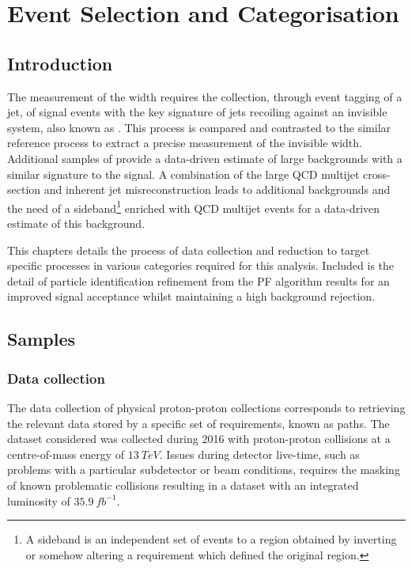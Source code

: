 \chapter{Event Selection and Categorisation}
\label{chap:analysis}


\section{Introduction}

The measurement of the \IZinv width requires the collection, through event
tagging of a jet, of \IZvvj signal events with the key signature of jets
recoiling against an invisible system, also known as \metplusjets. This
process is compared and contrasted to the similar \IDYllj reference process to
extract a precise measurement of the invisible width. Additional samples of
\IWlvj provide a data-driven estimate of large backgrounds with a similar
signature to the signal. A combination of the large QCD multijet cross-section
and inherent jet misreconstruction leads to additional backgrounds and the
need of a sideband\footnote{A sideband is an independent set of events to a
region obtained by inverting or somehow altering a requirement which defined
the original region.} enriched with QCD multijet events for a data-driven
estimate of this background.

This chapters details the process of data collection and reduction to target
specific processes in various categories required for this analysis. Included
is the detail of particle identification refinement from the PF algorithm
results for an improved signal acceptance whilst maintaining a high background
rejection.

\section{Samples}

\subsection{Data collection}

The data collection of physical proton-proton collections corresponds to
retrieving the relevant data stored by a specific set of \SWT requirements,
known as \SWT paths. The dataset considered was collected during 2016 with
proton-proton collisions at a centre-of-mass energy of ${\SI{13}{TeV}}$.
Issues during detector live-time, such as problems with a particular
subdetector or beam conditions, requires the masking of known problematic
collisions resulting in a dataset with an integrated luminosity of
${\SI{35.9}{fb^{-1}}}$.


